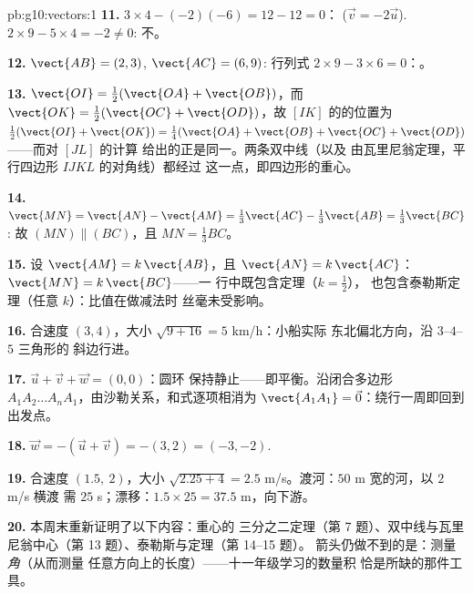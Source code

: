 \begin{solution}{pb:g10:vectors:1}
\textbf{11.} $3 \times 4 - (-2)(-6) = 12 - 12 = 0$：
($\vec v = -2\vec u$). $2 \times 9 - 5 \times 4 = -2 \neq 0$:
不。

\textbf{12.} $\vect{AB} = (2, 3)$, $\vect{AC} = (6, 9)$:
行列式 $2 \times 9 - 3 \times 6 = 0$：。

\textbf{13.} $\vect{OI} = \frac12(\vect{OA} + \vect{OB})$，而
$\vect{OK} = \frac12(\vect{OC} + \vect{OD})$，故
$[IK]$ 的的位置为
$\frac12(\vect{OI} + \vect{OK}) = \frac14(\vect{OA} +
\vect{OB} + \vect{OC} + \vect{OD})$——而对 $[JL]$ 的计算
给出的正是同一。两条双中线（以及
由瓦里尼翁定理，平行四边形 $IJKL$ 的对角线）都经过
这一点，即四边形的重心。

\textbf{14.} $\vect{MN} = \vect{AN} - \vect{AM} =
\frac13\vect{AC} - \frac13\vect{AB} = \frac13\vect{BC}$:
故 $(MN) \parallel (BC)$，且 $MN = \frac13 BC$。

\textbf{15.} 设 $\vect{AM} = k\,\vect{AB}$，且
$\vect{AN} = k\,\vect{AC}$：$\vect{MN} = k\,\vect{BC}$——一
行中既包含定理（$k = \frac12$），
也包含泰勒斯定理（任意 $k$）：比值在做减法时
丝毫未受影响。

\textbf{16.} 合速度 $(3, 4)$，大小
$\sqrt{9 + 16} = 5$ km/h：小船实际
东北偏北方向，沿 $3$--$4$--$5$ 三角形的
斜边行进。

\textbf{17.} $\vec u + \vec v + \vec w = (0, 0)$：圆环
保持静止——即平衡。沿闭合多边形
$A_1 A_2 \dots A_n A_1$，由沙勒关系，和式逐项相消为
$\vect{A_1 A_1} = \vec 0$：绕行一周即回到出发点。

\textbf{18.} $\vec w = -(\vec u + \vec v) = -(3, 2) =
(-3, -2)$.

\textbf{19.} 合速度 $(1.5,\ 2)$，大小
$\sqrt{2.25 + 4} = 2.5$ m/s。渡河：$50$ m 宽的河，以 $2$ m/s 横渡
需 $25$ s；漂移：$1.5 \times 25 = 37.5$ m，向下游。

\textbf{20.} 本周末重新证明了以下内容：重心的
三分之二定理（第 7 题）、双中线与瓦里尼翁中心（第
13 题）、泰勒斯与定理（第 14--15 题）。
箭头仍做不到的是：测量\emph{角}（从而测量
任意方向上的长度）——十一年级学习的数量积
恰是所缺的那件工具。
\end{solution}
